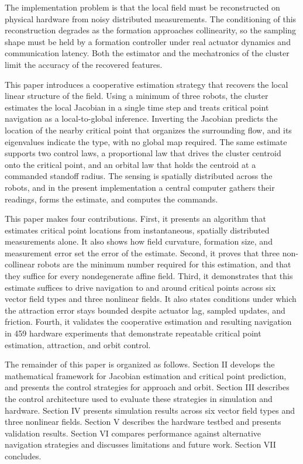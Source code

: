 \documentclass[lettersize,journal]{IEEEtran}
\newcommand{\rev}[1]{#1}
\begin{document}
The implementation problem is that the local field must be reconstructed on physical hardware from noisy distributed measurements. The conditioning of this reconstruction degrades as the formation approaches collinearity, so the sampling shape must be held by a formation controller under real actuator dynamics and communication latency. Both the estimator and the mechatronics of the cluster limit the accuracy of the recovered features.

This paper introduces a cooperative estimation strategy that recovers the local linear structure of the field. Using a minimum of three robots, the cluster estimates the local Jacobian in a single time step and treats critical point navigation as a local-to-global inference. Inverting the Jacobian predicts the location of the nearby critical point that organizes the surrounding flow, and its eigenvalues indicate the type, with no global map required. The same estimate supports two control laws, a proportional law that drives the cluster centroid onto the critical point, and an orbital law that holds the centroid at a commanded standoff radius. The sensing is spatially distributed across the robots, and in the present implementation a central computer gathers their readings, forms the estimate, and computes the commands.

This paper makes four contributions. First, it presents an algorithm that estimates critical point locations from instantaneous, spatially distributed measurements alone. It also shows how field curvature, formation size, and measurement error set the error of the estimate. Second, it proves that three non-collinear robots are the minimum number required for this estimation, and that they suffice for every nondegenerate affine field. Third, it demonstrates that this estimate suffices to drive navigation to and around critical points across six vector field types and three nonlinear fields. It also states conditions under which the attraction error stays bounded despite actuator lag, sampled updates, and friction. Fourth, it validates the cooperative estimation and resulting navigation in \rev{459} hardware experiments that demonstrate repeatable critical point estimation, attraction, and orbit control.

The remainder of this paper is organized as follows. Section II develops the mathematical framework for Jacobian estimation and critical point prediction, and presents the control strategies for approach and orbit. Section III describes the control architecture used to evaluate these strategies in simulation and hardware. Section IV presents simulation results across six vector field types and three nonlinear fields. Section V describes the hardware testbed and presents validation results. Section VI compares performance against alternative navigation strategies and discusses limitations and future work. Section VII concludes.
\end{document}
